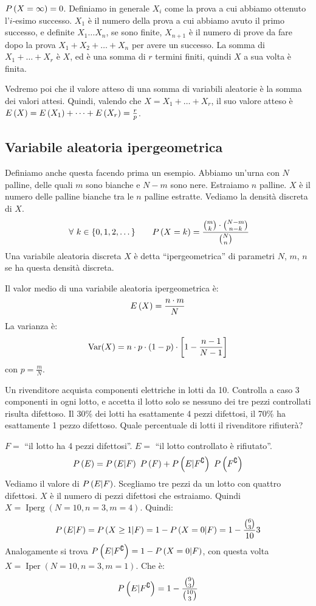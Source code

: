
$P \left( {X = \infty} \right) = 0$. Definiamo in generale $X_i$ come la prova a cui abbiamo ottenuto l'$i$-esimo successo. $X_1$ \`e il numero della prova a cui abbiamo avuto il primo successo, e definite $X_1 \dots X_n$, se sono finite, $X_{n +1}$ \`e il numero di prove da fare dopo la prova $X_1 + X_2 + \dots + X_n$ per avere un successo. La somma di $X_1 + \dots + X_r$ \`e $X$, ed \`e una somma di $r$ termini finiti, quindi $X$ a sua volta \`e finita.

Vedremo poi che il valore atteso di una somma di variabili aleatorie \`e la somma dei valori attesi. Quindi, valendo che $X = X_1 + \dots + X_r$, il suo valore atteso \`e $E \left( X \right) = E \left( X_1 \right) + \dots + E \left( X_r \right) = \frac{r}{p}$.

\subsection{Variabile aleatoria ipergeometrica}

\begin{defn}
Definiamo anche questa facendo prima un esempio. Abbiamo un'urna con $N$ palline, delle quali $m$ sono bianche e $N - m$ sono nere. Estraiamo $n$ palline. $X$ \`e il numero delle palline bianche tra le $n$ palline estratte. Vediamo la densit\`a discreta di $X$.
\[
\forall k \in \{ 0, 1, 2, \dots \} \qquad \prob{X = k} = \frac{\binom{m}{k} \cdot \binom{N - m}{n - k}}{\binom{N}{n}}
\]
Una variabile aleatoria discreta $X$ \`e detta ``ipergeometrica'' di parametri $N$, $m$, $n$ se ha questa densit\`a discreta.

Il valor medio di una variabile aleatoria ipergeometrica \`e:
\[
E \left( X \right) = \frac{n \cdot m}{N}
\]
La varianza \`e:
\[
\operatorname{Var} (X) = n \cdot p \cdot (1 - p) \cdot \left[ 1 - \frac{n - 1}{N - 1} \right]
\]
con $p = \frac{m}{N}$.
\end{defn}
\begin{exmp}
Un rivenditore acquista componenti elettriche in lotti da 10. Controlla a caso 3 componenti in ogni lotto, e accetta il lotto solo se nessuno dei tre pezzi controllati risulta difettoso. Il 30\% dei lotti ha esattamente 4 pezzi difettosi, il 70\% ha esattamente 1 pezzo difettoso. Quale percentuale di lotti il rivenditore rifiuter\`a?

$F = $ ``il lotto ha 4 pezzi difettosi''. $E = $ ``il lotto controllato \`e rifiutato''.
\[
P \left( {E} \right) = P \left( E | F \right) \ P \left( {F} \right) + P \left( E | F^{\complement} \right) \ P \left( {F^{\complement}} \right)
\]
Vediamo il valore di $P \left( E | F \right)$. Scegliamo tre pezzi da un lotto con quattro difettosi. $X$ \`e il numero di pezzi difettosi che estraiamo. Quindi $X = \operatorname{Iperg}(N = 10, n = 3, m = 4)$. Quindi:
\[
P \left( E | F \right) = P \left( X \ge 1 | F \right) = 1 - P \left( X = 0 | F \right) =
1 - \frac{\binom{6}{3}}{10}{3}
\]
Analogamente si trova $P \left( E | F^{\complement} \right) = 1 - P \left( X =0 | F \right)$, con questa volta $X = \operatorname{Iper}(N = 10, n = 3, m = 1)$. Che \`e:
\[
P \left( E | F^{\complement} \right) = 1 - \frac{\binom{9}{3}}{\binom{10}{3}}
\]
\end{exmp}

